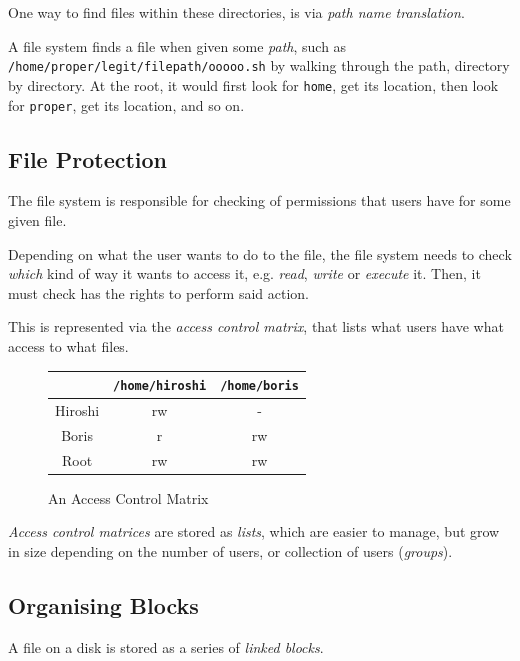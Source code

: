 \documentclass[a4]{article}
\begin{document}
One way to find files within these directories, is via \textit{path name translation}.

A file system finds a file when given some \textit{path}, such as \texttt{/home/proper/legit/filepath/ooooo.sh} by walking through the path, directory by directory. At the root, it would first look for \texttt{home}, get its location, then look for \texttt{proper}, get its location, and so on.

\subsection{File Protection}

The file system is responsible for checking of permissions that users have for some given file.

Depending on what the user wants to do to the file, the file system needs to check \textit{which} kind of way it wants to access it, e.g. \textit{read}, \textit{write} or \textit{execute} it. Then, it must check has the rights to perform said action.

This is represented via the \textit{access control matrix}, that lists what users have what access to what files.

\begin{figure}[H]
  \centering
  \begin{tabular}{|c|c|c|}
    \hline
    & \texttt{/home/hiroshi} & \texttt{/home/boris}\\
    \hline
    Hiroshi & rw & -\\
    \hline
    Boris & r & rw\\
    \hline
    Root & rw & rw\\
    \hline
  \end{tabular}
  \caption{An Access Control Matrix}
\end{figure}

\textit{Access control matrices} are stored as \textit{lists}, which are easier to manage, but grow in size depending on the number of users, or collection of users (\textit{groups}).

\subsection{Organising Blocks}

A file on a disk is stored as a series of \textit{linked blocks}. 
\end{document}
